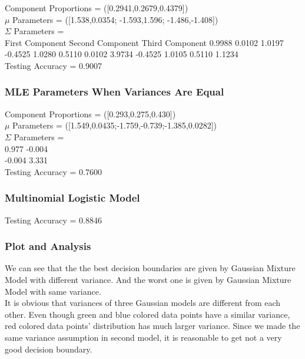 \documentclass[letter,11pt]{article}
\begin{document}
	Component Proportions = ([0.2941,0.2679,0.4379])\\
	$\mu$ Parameters = ([1.538,0.0354; -1.593,1.596; -1.486,-1.408])\\
	$\Sigma$ Parameters  =\\
	First Component \hspace{15mm} Second Component \hspace{15mm} Third Component
	0.9988    0.0102 \hspace{25mm}  1.0197   -0.4525 \hspace{25mm}      1.0280    0.5110
    0.0102    3.9734  \hspace{25mm} -0.4525    1.0105 \hspace{24mm}      0.5110    1.1234\\
    Testing Accuracy = 0.9007
    
    \subsubsection{MLE Parameters When Variances Are Equal}
	Component Proportions = ([0.293,0.275,0.430])\\
	$\mu$ Parameters = ([1.549,0.0435;-1.759,-0.739;-1.385,0.0282])\\
	$\Sigma$ Parameters  =\\
	0.977 -0.004\\
	 -0.004 3.331\\
	Testing Accuracy = 0.7600
	
	\subsubsection{Multinomial Logistic Model}
	Testing Accuracy = 0.8846
	
	\subsubsection{Plot and Analysis}	
		 
		 We can see that the the best decision boundaries are given by Gaussian Mixture Model with different variance. And the worst one is given by Gaussian Mixture Model with same variance.\\
		 
		 
		 It is obvious that variances of three Gaussian models are different from each other. Even though green and blue colored data points have a similar variance, red colored data points' distribution has much larger variance. Since we made the same variance assumption in second model, it is reasonable to get not a very good decision boundary.\\
		 
\end{document}
